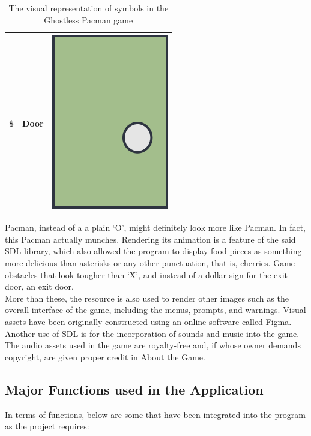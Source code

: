 \begin{table}[H]
\begin{tabular}{ c c c }
        \$ & Door & \includegraphics[scale=0.1]{assets/door_sample.png}\\
        \bottomrule
    \end{tabular}
    \caption{The visual representation of symbols in the Ghostless Pacman game}
    \label{tab:1}
\end{table}

Pacman, instead of a a plain `O', might definitely look more like Pacman. In
fact, this Pacman actually munches. Rendering its animation is a feature of the
said SDL library, which also allowed the program to display food pieces
as something more delicious than asterisks or any other punctuation, that is,
cherries. Game obstacles that look tougher than `X', and instead of a
dollar sign for the exit door, an exit door.\\

More than these, the resource is also used to render other images such as the
overall interface of the game, including the menus, prompts, and warnings.
Visual assets have been originally constructed using an online software called
\href{https://www.figma.com/}{Figma}.\\

Another use of SDL is for the incorporation of sounds and music into the game.
The audio assets used in the game are royalty-free and, if whose owner demands
copyright, are given proper credit in About the Game.\\


\subsection{Major Functions used in the Application}
In terms of functions, below are some that have been integrated into the
program as the project requires:

